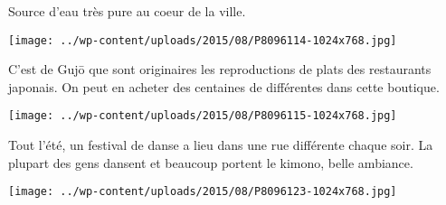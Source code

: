  

 Source d'eau très pure au coeur de la ville. 

 

\begin{center} \texttt{[image: ../wp-content/uploads/2015/08/P8096114-1024x768.jpg]} \end{center}

 

 C'est de Gujō que sont originaires les reproductions de plats des restaurants japonais. On peut en acheter des centaines de différentes dans cette boutique. 

 

\begin{center} \texttt{[image: ../wp-content/uploads/2015/08/P8096115-1024x768.jpg]} \end{center}

 

 Tout l'été, un festival de danse a lieu dans une rue différente chaque soir. La plupart des gens dansent et beaucoup portent le kimono, belle ambiance. 

 

\begin{center} \texttt{[image: ../wp-content/uploads/2015/08/P8096123-1024x768.jpg]} \end{center}




 
 
